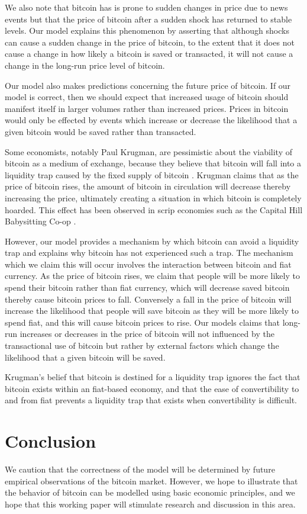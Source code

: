 \documentclass[twoside]{article}
\begin{document}
\begin{multicols}{2}
We also note that bitcoin has is prone to sudden changes in price due
to news events but that the price of bitcoin after a sudden shock has
returned to stable levels.  Our model explains this phenomenon by
asserting that although shocks can cause a sudden change in the price
of bitcoin, to the extent that it does not cause a change in how
likely a bitcoin is saved or transacted, it will not cause a change in
the long-run price level of bitcoin.

Our model also makes predictions concerning the future price of
bitcoin.  If our model is correct, then we should expect that
increased usage of bitcoin should manifest itself in larger volumes
rather than increased prices.  Prices in bitcoin would only be
effected by events which increase or decrease the likelihood that a
given bitcoin would be saved rather than transacted.

Some economists, notably Paul Krugman, are pessimistic about the
viability of bitcoin as a medium of exchange, because they believe
that bitcoin will fall into a liquidity trap caused by the fixed
supply of bitcoin \cite{krugman1}.  Krugman claims that as the price
of bitcoin rises, the amount of bitcoin in circulation will decrease
thereby increasing the price, ultimately creating a situation in
which bitcoin is completely hoarded.  This effect has been observed
in scrip economies such as the Capital Hill Babysitting Co-op 
\cite{krugman2}.

However, our model provides a mechanism by which bitcoin can avoid a
liquidity trap and explains why bitcoin has not experienced such a
trap.  The mechanism which we claim this will occur involves the
interaction between bitcoin and fiat currency.  As the price of
bitcoin rises, we claim that people will be more likely to spend their
bitcoin rather than fiat currency, which will decrease saved bitcoin
thereby cause bitcoin prices to fall.  Conversely a fall in the price
of bitcoin will increase the likelihood that people will save bitcoin
as they will be more likely to spend fiat, and this will cause bitcoin
prices to rise.  Our models claims that long-run increases or
decreases in the price of bitcoin will not influenced by the
transactional use of bitcoin but rather by external factors which
change the likelihood that a given bitcoin will be saved.

Krugman's belief that bitcoin is destined for a liquidity trap ignores
the fact that bitcoin exists within an fiat-based economy, and that
the ease of convertibility to and from fiat prevents a liquidity trap
that exists when convertibility is difficult.

\section{Conclusion}
We caution that the correctness of the model will be determined by
future empirical observations of the bitcoin market.  However, we hope
to illustrate that the behavior of bitcoin can be modelled using basic
economic principles, and we hope that this working paper will
stimulate research and discussion in this area.


\end{multicols}
\end{document}
